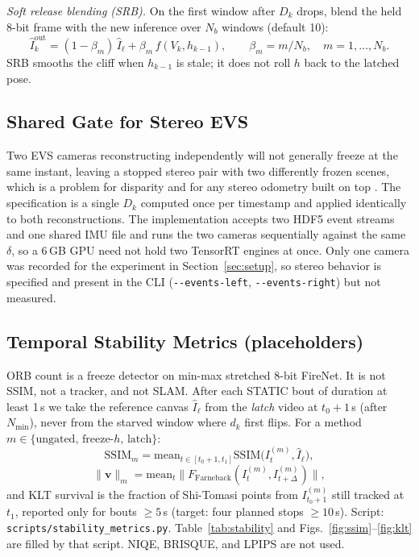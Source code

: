 \documentclass[journal]{IEEEtran}
\begin{document}
\textit{Soft release blending (SRB).} On the first window after \(D_k\) drops,
blend the held 8-bit frame with the new inference over \(N_b\) windows
(default 10):
\begin{equation}
\label{eq:srb}
\hat{I}_k^{\mathrm{out}} = (1-\beta_m)\,\hat{I}_{\ell} + \beta_m\, f(V_k,h_{k-1}),
\qquad
\beta_m = m/N_b,\quad m=1,\ldots,N_b.
\end{equation}
SRB smooths the cliff when \(h_{k-1}\) is stale; it does not roll \(h\) back
to the latched pose.

\subsection{Shared Gate for Stereo EVS}
Two EVS cameras reconstructing independently will not generally freeze at the
same instant, leaving a stopped stereo pair with two differently frozen scenes,
which is a problem for disparity and for any stereo odometry built on top
\cite{zhou2021}. The specification is a single \(D_k\) computed once per
timestamp and applied identically to both reconstructions. The implementation
accepts two HDF5 event streams and one shared IMU file and runs the two cameras
sequentially against the same \(\delta\), so a 6\,GB GPU need not hold two
TensorRT engines at once. Only one camera was recorded for the experiment in
Section~\ref{sec:setup}, so stereo behavior is specified and present in the CLI
(\texttt{-{}-events-left}, \texttt{-{}-events-right}) but not measured.

\subsection{Temporal Stability Metrics (placeholders)}
\label{sec:metrics}
ORB count is a freeze detector on min-max stretched 8-bit FireNet. It is not
SSIM, not a tracker, and not SLAM. After each STATIC bout of duration at least
1\,s we take the reference canvas \(\hat{I}_{\ell}\) from the \emph{latch}
video at \(t_0+1\)\,s (after \(N_{\min}\)), never from the starved window where
\(d_k\) first flips. For a method \(m\in\{\text{ungated},\,\text{freeze-}h,\,\text{latch}\}\):
\begin{equation}
\mathrm{SSIM}_m
= \mathrm{mean}_{t\in[t_0+1,t_1]}
\mathrm{SSIM}\bigl(I_t^{(m)}, \hat{I}_{\ell}\bigr),
\end{equation}
\begin{equation}
\|\mathbf{v}\|_m
= \mathrm{mean}_{t}
\bigl\|F_{\mathrm{Farneback}}(I_t^{(m)}, I_{t+\Delta}^{(m)})\bigr\|,
\end{equation}
and KLT survival is the fraction of Shi-Tomasi points from \(I_{t_0+1}^{(m)}\)
still tracked at \(t_1\), reported only for bouts \(\ge 5\)\,s (target: four
planned stops \(\ge 10\)\,s). Script: \texttt{scripts/stability\_metrics.py}.
Table~\ref{tab:stability} and Figs.~\ref{fig:ssim}--\ref{fig:klt} are filled by
that script. NIQE, BRISQUE, and LPIPS are not used.
\end{document}
